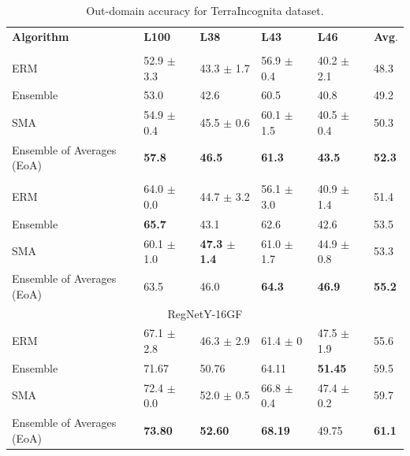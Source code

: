 \begin{table}[]
\centering
\caption{Out-domain accuracy for TerraIncognita dataset.}
\begin{tabular}{lllll|l}
\hline
\textbf{Algorithm}          & \textbf{L100}           & \textbf{L38}           & \textbf{L43}     & \textbf{L46}    & \textbf{Avg}. \\ \hhline{=====|=}
\multicolumn{6}{c}{{ResNet-50}}\\
\hline
ERM & 52.9 $\pm$ 3.3          & 43.3 $\pm$ 1.7           & 56.9 $\pm$ 0.4         & 40.2 $\pm$ 2.1         & 48.3\\
Ensemble & 53.0             & 42.6           &       60.5         & 40.8 &   49.2  \\
\hline
\rowcolor{Gray}
SMA & 54.9 $\pm$ 0.4           & 45.5 $\pm$ 0.6          & 60.1 $\pm$ 1.5          & 40.5 $\pm$ 0.4         & 50.3\\
 \rowcolor{Gray}
Ensemble of Averages (EoA) & \textbf{57.8}           & \textbf{46.5}           & \textbf{61.3}          &       \textbf{43.5}        & \textbf{52.3} \\ 
\hhline{=====|=}
\multicolumn{6}{c}{{ResNeXt-50 32x4d  \cite{yalniz2019billion}}}\\
\hline
ERM & 64.0 $\pm$ 0.0           & 44.7 $\pm$ 3.2           & 56.1 $\pm$ 3.0          & 40.9 $\pm$ 1.4         & 51.4\\
Ensemble & \textbf{65.7}             & 43.1               & 62.6       &        42.6    & 53.5  \\
\hline
\rowcolor{Gray}
SMA & 60.1 $\pm$ 1.0           & \textbf{47.3 $\pm$ 1.4}           & 61.0 $\pm$ 1.7          & 44.9 $\pm$ 0.8         & 53.3\\
 \rowcolor{Gray}
Ensemble of Averages (EoA) & 63.5        & 46.0   & \textbf{64.3}   &  \textbf{46.9}  & \textbf{55.2} \\
\hline
\multicolumn{6}{c}{{RegNetY-16GF \cite{singh2022revisiting}}}\\
\hline
ERM & 67.1 $\pm$    2.8        & 46.3 $\pm$    2.9        & 61.4 $\pm$  0    & 47.5  $\pm$  1.9      & 55.6 \\
Ensemble & {71.67}     &       50.76       &      64.11  &      \textbf{51.45}    &  59.5 \\
\hline
\rowcolor{Gray}
SMA & 72.4 $\pm$ 0.0          & {52.0 $\pm$ 0.5}           & 66.8  $\pm$ 0.4         & 47.4 $\pm$ 0.2        & 59.7 \\
 \rowcolor{Gray}
Ensemble of Averages (EoA) &   \textbf{73.80}     &  \textbf{52.60}  & \textbf{68.19}   &  {49.75}  & \textbf{61.1} \\
\hline
\end{tabular}
\label{tab:terra_perf}
\end{table}



